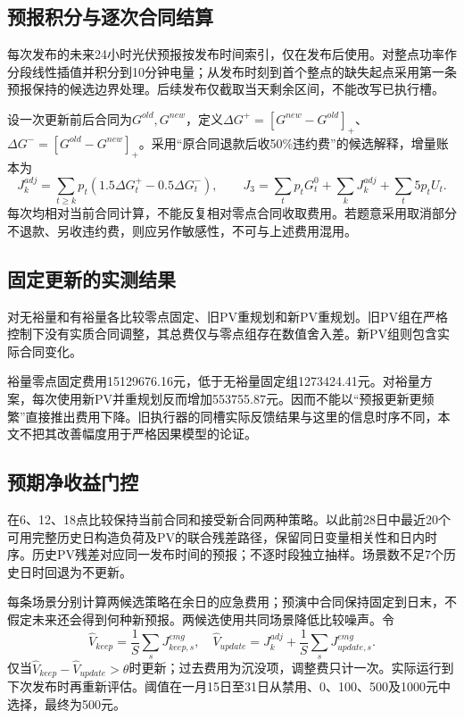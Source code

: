 \documentclass[UTF8,a4paper,zihao=-4,fontset=fandol]{ctexart}
\begin{document}
\subsection{预报积分与逐次合同结算}
每次发布的未来24小时光伏预报按发布时间索引，仅在发布后使用。对整点功率作分段线性插值并积分到10分钟电量；从发布时刻到首个整点的缺失起点采用第一条预报保持的候选边界处理。后续发布仅截取当天剩余区间，不能改写已执行槽。

设一次更新前后合同为$G^{old},G^{new}$，定义$\Delta G^+=[G^{new}-G^{old}]_+$、$\Delta G^-=[G^{old}-G^{new}]_+$。采用“原合同退款后收50\%违约费”的候选解释，增量账本为
\begin{equation}
J^{adj}_k=\sum_{t\ge k}p_t(1.5\Delta G_t^+-0.5\Delta G_t^-),\qquad
J_3=\sum_t p_tG_t^{0}+\sum_kJ^{adj}_k+\sum_t5p_tU_t.
\end{equation}
每次均相对当前合同计算，不能反复相对零点合同收取费用。若题意采用取消部分不退款、另收违约费，则应另作敏感性，不可与上述费用混用。

\subsection{固定更新的实测结果}
对无裕量和有裕量各比较零点固定、旧PV重规划和新PV重规划。旧PV组在严格控制下没有实质合同调整，其总费仅与零点组存在数值舍入差。新PV组则包含实际合同变化。
\begin{table}[H]\centering\caption{第三问334天费用分解（万元）；旧PV组与对应固定组数值相同，正文不重复列示}\small\end{table}

裕量零点固定费用15129676.16元，低于无裕量固定组1273424.41元。对裕量方案，每次使用新PV并重规划反而增加553755.87元。因而不能以“预报更新更频繁”直接推出费用下降。旧执行器的同槽实际反馈结果与这里的信息时序不同，本文不把其改善幅度用于严格因果模型的论证。

\subsection{预期净收益门控}
在6、12、18点比较保持当前合同和接受新合同两种策略。以此前28日中最近20个可用完整历史日构造负荷及PV的联合残差路径，保留同日变量相关性和日内时序。历史PV残差对应同一发布时间的预报；不逐时段独立抽样。场景数不足7个历史日时回退为不更新。

每条场景分别计算两候选策略在余日的应急费用；预演中合同保持固定到日末，不假定未来还会得到何种新预报。两候选使用共同场景降低比较噪声。令
\begin{equation}
\widehat V_{keep}=\frac1S\sum_s J^{emg}_{keep,s},\quad
\widehat V_{update}=J^{adj}_k+\frac1S\sum_sJ^{emg}_{update,s}.
\end{equation}
仅当$\widehat V_{keep}-\widehat V_{update}>\theta$时更新；过去费用为沉没项，调整费只计一次。实际运行到下次发布时再重新评估。阈值在一月15日至31日从禁用、0、100、500及1000元中选择，最终为500元。
\end{document}
